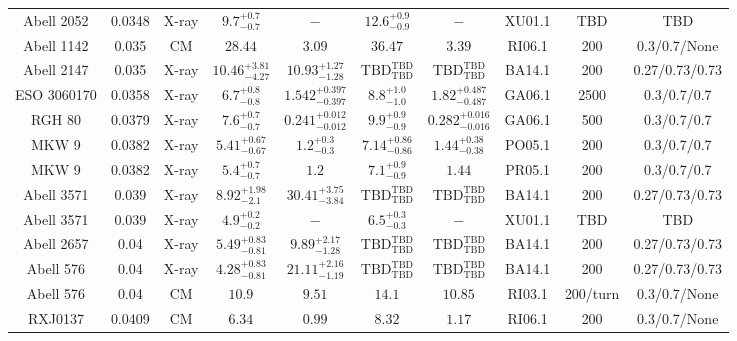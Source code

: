 \begin{table}
\begin{tabular}{cccccccccc}
Abell 2052 & 0.0348 & X-ray & ${9.7}^{+0.7}_{-0.7}$ & ${-}^{}_{}$ & ${12.6}^{+0.9}_{-0.9}$ & ${-}^{}_{}$ & XU01.1 & TBD & TBD \\
Abell 1142 & 0.035 & CM & ${28.44}^{}_{}$ & ${3.09}^{}_{}$ & ${36.47}^{}_{}$ & ${3.39}^{}_{}$ & RI06.1 & 200 & 0.3/0.7/None \\
Abell 2147 & 0.035 & X-ray & ${10.46}^{+3.81}_{-4.27}$ & ${10.93}^{+1.27}_{-1.28}$ & ${\mathrm{TBD}}^{\mathrm{TBD}}_{\mathrm{TBD}}$ & ${\mathrm{TBD}}^{\mathrm{TBD}}_{\mathrm{TBD}}$ & BA14.1 & 200 & 0.27/0.73/0.73 \\
ESO 3060170 & 0.0358 & X-ray & ${6.7}^{+0.8}_{-0.8}$ & ${1.542}^{+0.397}_{-0.397}$ & ${8.8}^{+1.0}_{-1.0}$ & ${1.82}^{+0.487}_{-0.487}$ & GA06.1 & 2500 & 0.3/0.7/0.7 \\
RGH 80 & 0.0379 & X-ray & ${7.6}^{+0.7}_{-0.7}$ & ${0.241}^{+0.012}_{-0.012}$ & ${9.9}^{+0.9}_{-0.9}$ & ${0.282}^{+0.016}_{-0.016}$ & GA06.1 & 500 & 0.3/0.7/0.7 \\
MKW 9 & 0.0382 & X-ray & ${5.41}^{+0.67}_{-0.67}$ & ${1.2}^{+0.3}_{-0.3}$ & ${7.14}^{+0.86}_{-0.86}$ & ${1.44}^{+0.38}_{-0.38}$ & PO05.1 & 200 & 0.3/0.7/0.7 \\
MKW 9 & 0.0382 & X-ray & ${5.4}^{+0.7}_{-0.7}$ & ${1.2}^{}_{}$ & ${7.1}^{+0.9}_{-0.9}$ & ${1.44}^{}_{}$ & PR05.1 & 200 & 0.3/0.7/0.7 \\
Abell 3571 & 0.039 & X-ray & ${8.92}^{+1.98}_{-2.1}$ & ${30.41}^{+3.75}_{-3.84}$ & ${\mathrm{TBD}}^{\mathrm{TBD}}_{\mathrm{TBD}}$ & ${\mathrm{TBD}}^{\mathrm{TBD}}_{\mathrm{TBD}}$ & BA14.1 & 200 & 0.27/0.73/0.73 \\
Abell 3571 & 0.039 & X-ray & ${4.9}^{+0.2}_{-0.2}$ & ${-}^{}_{}$ & ${6.5}^{+0.3}_{-0.3}$ & ${-}^{}_{}$ & XU01.1 & TBD & TBD \\
Abell 2657 & 0.04 & X-ray & ${5.49}^{+0.83}_{-0.81}$ & ${9.89}^{+2.17}_{-1.28}$ & ${\mathrm{TBD}}^{\mathrm{TBD}}_{\mathrm{TBD}}$ & ${\mathrm{TBD}}^{\mathrm{TBD}}_{\mathrm{TBD}}$ & BA14.1 & 200 & 0.27/0.73/0.73 \\
Abell 576 & 0.04 & X-ray & ${4.28}^{+0.83}_{-0.81}$ & ${21.11}^{+2.16}_{-1.19}$ & ${\mathrm{TBD}}^{\mathrm{TBD}}_{\mathrm{TBD}}$ & ${\mathrm{TBD}}^{\mathrm{TBD}}_{\mathrm{TBD}}$ & BA14.1 & 200 & 0.27/0.73/0.73 \\
Abell 576 & 0.04 & CM & ${10.9}^{}_{}$ & ${9.51}^{}_{}$ & ${14.1}^{}_{}$ & ${10.85}^{}_{}$ & RI03.1 & 200/turn & 0.3/0.7/None \\
RXJ0137 & 0.0409 & CM & ${6.34}^{}_{}$ & ${0.99}^{}_{}$ & ${8.32}^{}_{}$ & ${1.17}^{}_{}$ & RI06.1 & 200 & 0.3/0.7/None \\

\end{tabular}
\end{table}
